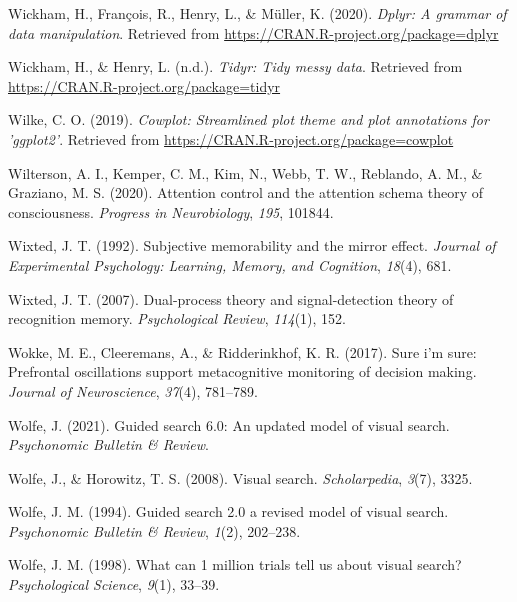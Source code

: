 \documentclass[12pt,twoside]{reedthesis}
\begin{document}
\leavevmode\hypertarget{ref-R-dplyr}{}%
Wickham, H., François, R., Henry, L., \& Müller, K. (2020). \emph{Dplyr: A grammar of data manipulation}. Retrieved from \url{https://CRAN.R-project.org/package=dplyr}

\leavevmode\hypertarget{ref-R-tidyr}{}%
Wickham, H., \& Henry, L. (n.d.). \emph{Tidyr: Tidy messy data}. Retrieved from \url{https://CRAN.R-project.org/package=tidyr}

\leavevmode\hypertarget{ref-R-cowplot}{}%
Wilke, C. O. (2019). \emph{Cowplot: Streamlined plot theme and plot annotations for 'ggplot2'}. Retrieved from \url{https://CRAN.R-project.org/package=cowplot}

\leavevmode\hypertarget{ref-wilterson2020attention}{}%
Wilterson, A. I., Kemper, C. M., Kim, N., Webb, T. W., Reblando, A. M., \& Graziano, M. S. (2020). Attention control and the attention schema theory of consciousness. \emph{Progress in Neurobiology}, \emph{195}, 101844.

\leavevmode\hypertarget{ref-wixted1992subjective}{}%
Wixted, J. T. (1992). Subjective memorability and the mirror effect. \emph{Journal of Experimental Psychology: Learning, Memory, and Cognition}, \emph{18}(4), 681.

\leavevmode\hypertarget{ref-wixted2007dual}{}%
Wixted, J. T. (2007). Dual-process theory and signal-detection theory of recognition memory. \emph{Psychological Review}, \emph{114}(1), 152.

\leavevmode\hypertarget{ref-wokke2017sure}{}%
Wokke, M. E., Cleeremans, A., \& Ridderinkhof, K. R. (2017). Sure i'm sure: Prefrontal oscillations support metacognitive monitoring of decision making. \emph{Journal of Neuroscience}, \emph{37}(4), 781--789.

\leavevmode\hypertarget{ref-wolfe2021guided}{}%
Wolfe, J. (2021). Guided search 6.0: An updated model of visual search. \emph{Psychonomic Bulletin \& Review}.

\leavevmode\hypertarget{ref-wolfe2008visual}{}%
Wolfe, J., \& Horowitz, T. S. (2008). Visual search. \emph{Scholarpedia}, \emph{3}(7), 3325.

\leavevmode\hypertarget{ref-wolfe1994guided}{}%
Wolfe, J. M. (1994). Guided search 2.0 a revised model of visual search. \emph{Psychonomic Bulletin \& Review}, \emph{1}(2), 202--238.

\leavevmode\hypertarget{ref-wolfe1998can}{}%
Wolfe, J. M. (1998). What can 1 million trials tell us about visual search? \emph{Psychological Science}, \emph{9}(1), 33--39.
\end{document}

